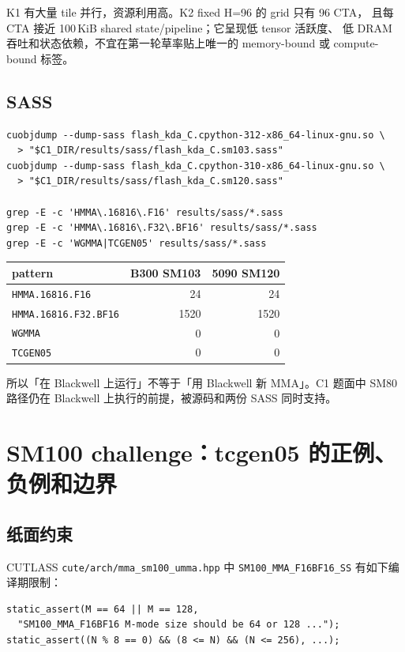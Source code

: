 \documentclass[11pt,a4paper,fontset=none]{ctexart}
\newcommand{\code}[1]{\texttt{#1}}
\begin{document}
K1 有大量 tile 并行，资源利用高。K2 fixed H=96 的 grid 只有 96 CTA，
且每 CTA 接近 100\,KiB shared state/pipeline；它呈现低 tensor 活跃度、
低 DRAM 吞吐和状态依赖，不宜在第一轮草率贴上唯一的 memory-bound 或
compute-bound 标签。

\subsection{SASS}

\begin{lstlisting}
cuobjdump --dump-sass flash_kda_C.cpython-312-x86_64-linux-gnu.so \
  > "$C1_DIR/results/sass/flash_kda_C.sm103.sass"
cuobjdump --dump-sass flash_kda_C.cpython-310-x86_64-linux-gnu.so \
  > "$C1_DIR/results/sass/flash_kda_C.sm120.sass"

grep -E -c 'HMMA\.16816\.F16' results/sass/*.sass
grep -E -c 'HMMA\.16816\.F32\.BF16' results/sass/*.sass
grep -E -c 'WGMMA|TCGEN05' results/sass/*.sass
\end{lstlisting}

\begin{center}\small
\begin{tabular}{@{}lrr@{}}
\toprule
pattern & B300 SM103 & 5090 SM120 \\
\midrule
\code{HMMA.16816.F16} & 24 & 24 \\
\code{HMMA.16816.F32.BF16} & 1520 & 1520 \\
\code{WGMMA} & 0 & 0 \\
\code{TCGEN05} & 0 & 0 \\
\bottomrule
\end{tabular}
\end{center}

所以「在 Blackwell 上运行」不等于「用 Blackwell 新 MMA」。C1 题面中
SM80 路径仍在 Blackwell 上执行的前提，被源码和两份 SASS 同时支持。

\section{SM100 challenge：tcgen05 的正例、负例和边界}

\subsection{纸面约束}

CUTLASS \code{cute/arch/mma\_sm100\_umma.hpp} 中
\code{SM100\_MMA\_F16BF16\_SS} 有如下编译期限制：

\begin{lstlisting}
static_assert(M == 64 || M == 128,
  "SM100_MMA_F16BF16 M-mode size should be 64 or 128 ...");
static_assert((N % 8 == 0) && (8 <= N) && (N <= 256), ...);
\end{lstlisting}
\end{document}
